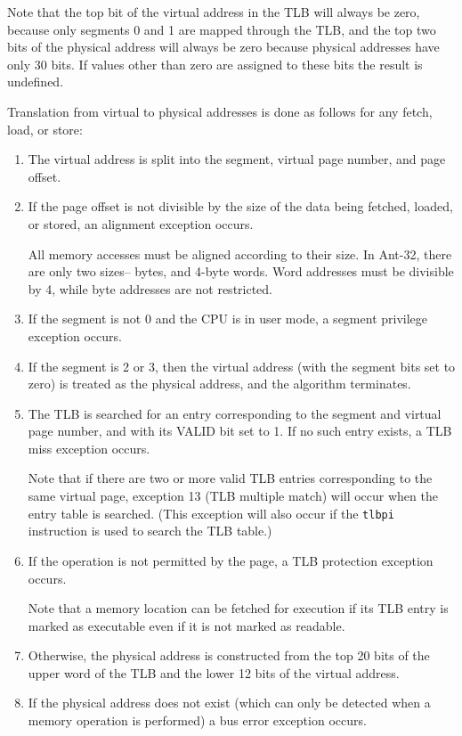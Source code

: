 Note that the top bit of the virtual address in the TLB will always be
zero, because only segments 0 and 1 are mapped through the TLB, and
the top two bits of the physical address will always be zero because
physical addresses have only 30 bits.  If values other than zero are
assigned to these bits the result is undefined.

Translation from virtual to physical addresses is done as follows for
any fetch, load, or store:

\begin{enumerate}

	\item The virtual address is split into the segment, virtual
		page number, and page offset.

	\item If the page offset is not divisible by the size of the
		data being fetched, loaded, or stored, an alignment
		exception occurs.

		All memory accesses must be aligned according to their
		size.  In Ant-32, there are only two sizes-- bytes, and
		4-byte words.  Word addresses must be divisible by 4,
		while byte addresses are not restricted.

	\item If the segment is not 0 and the CPU is in user mode, a
		segment privilege exception occurs.

	\item If the segment is 2 or 3, then the virtual address (with
		the segment bits set to zero) is treated as the
		physical address, and the algorithm terminates.

	\item The TLB is searched for an entry corresponding to the
		segment and virtual page number, and with its {\sc
		VALID} bit set to 1.  If no such entry exists, a TLB
		miss exception occurs.

		Note that if there are two or more valid TLB entries
		corresponding to the same virtual page, exception 13
		(TLB multiple match) will occur when the entry table
		is searched.  (This exception will also occur if the
		{\tt tlbpi} instruction is used to search the TLB
		table.)

	\item If the operation is not permitted by the page, a
		TLB protection exception occurs.

		Note that a memory location can be fetched for
		execution if its TLB entry is marked as executable
		even if it is not marked as readable.

	\item Otherwise, the physical address is constructed from the
		top 20 bits of the upper word of the TLB and the lower
		12 bits of the virtual address.

	\item If the physical address does not exist (which can only
		be detected when a memory operation is performed) a
		bus error exception occurs.

\end{enumerate}

